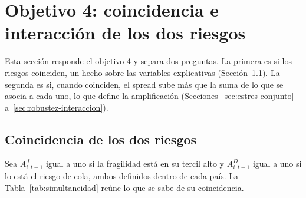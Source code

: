 \section{Objetivo 4: coincidencia e interacción de los dos riesgos}
\label{sec:aditivos}

Esta sección responde el objetivo 4 y separa dos preguntas. La primera es si los riesgos coinciden, un hecho sobre las variables explicativas (Sección~\ref{sec:simultaneidad}). La segunda es si, cuando coinciden, el spread sube más que la suma de lo que se asocia a cada uno, lo que define la amplificación (Secciones~\ref{sec:estres-conjunto} a~\ref{sec:robustez-interaccion}).

\subsection{Coincidencia de los dos riesgos}
\label{sec:simultaneidad}

Sea $A^{J}_{i,t-1}$ igual a uno si la fragilidad está en su tercil alto y $A^{D}_{i,t-1}$ igual a uno si lo está el riesgo de cola, ambos definidos dentro de cada país. La Tabla~\ref{tab:simultaneidad} reúne lo que se sabe de su coincidencia.

